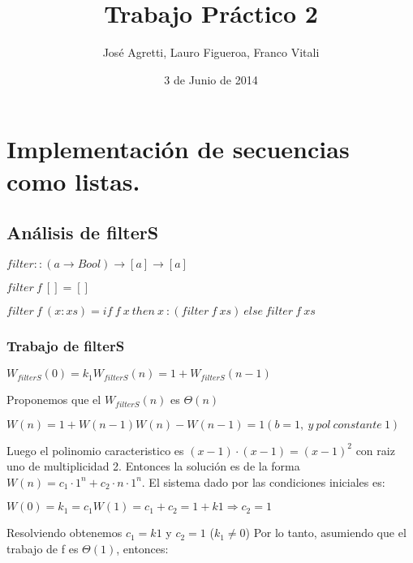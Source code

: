\documentclass[a4paper,12pt]{article}
\begin{document}
\title{Trabajo Práctico 2}
\author{José Agretti, Lauro Figueroa, Franco Vitali}
\date{3 de Junio de 2014}
\maketitle

\newpage

\section{Implementación de secuencias como listas.}

\subsection{Análisis de filterS}

$    filter :: (a \rightarrow Bool) \rightarrow [a] \rightarrow [a] $

$    filter\: f\: [] = []$

  $  filter\: f\: (x:xs) = if\: f\: x\: then\: x\: : (filter\: f \:xs)\: else\: filter\: f\: xs$



\subsubsection{Trabajo de filterS}


\begin{math}
    W_{filterS} (0) = k_1
    W_{filterS} (n) = 1 + W_{filterS} (n-1) 
\end{math}


Proponemos que el $W_{filterS}(n)$ es $\Theta(n) $

\begin{math}
    W(n) = 1 + W(n-1)
    W(n) - W(n-1) = 1 (b = 1,\: y\: pol\: constante \:1)
\end{math}


    Luego el polinomio caracteristico es $(x - 1) \cdot (x - 1) = (x - 1)^2$ con 
    raiz uno de multiplicidad 2. Entonces la solución es de la forma 
    $W(n) = c_1 \cdot 1^n + c_2 \cdot n \cdot 1^n$. 
    El sistema dado por las condiciones iniciales es:

    \begin{math}
        W(0) = k_1 = c_1
        W(1) = c_1 + c_2 = 1 + k1 \Rightarrow c_2 = 1
    \end{math}
    
    Resolviendo obtenemos $c_1 = k1$ y $c_2 = 1$ ($k_1 \neq 0$)
    Por lo tanto, asumiendo que el trabajo de f es $\Theta(1)$, entonces:
\end{document}
